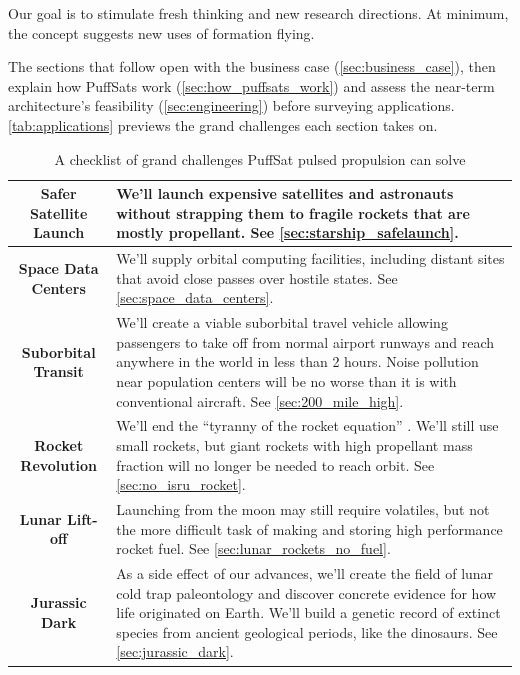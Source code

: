 \documentclass{article}
\begin{document}
Our goal is to stimulate fresh thinking and new research directions. At minimum, the concept suggests new uses of formation flying.

The sections that follow open with the business case (\autoref{sec:business_case}), then explain how PuffSats work (\autoref{sec:how_puffsats_work}) and assess the near-term architecture's feasibility (\autoref{sec:engineering}) before surveying applications. \autoref{tab:applications} previews the grand challenges each section takes on.

\begin{table}[!htpb]
    \centering
    \caption{A checklist of grand challenges PuffSat pulsed propulsion can solve}
    \label{tab:applications}
    \begin{tabularx}{\textwidth}{|c|L|}\hline
        \textbf{Safer Satellite Launch} & We'll launch expensive satellites and astronauts without strapping them to fragile rockets that are mostly propellant.   See \autoref{sec:starship_safelaunch}. \\\hline
        \textbf{Space Data Centers} & We'll supply orbital computing facilities, including distant sites that avoid close passes over hostile states. See \autoref{sec:space_data_centers}. \\\hline
        \textbf{Suborbital Transit} & We'll create a viable suborbital travel vehicle allowing passengers to take off from normal airport runways and reach anywhere in the world in less than 2 hours. Noise pollution near population centers will be no worse than it is with conventional aircraft.  See \autoref{sec:200_mile_high}.\\\hline
        \textbf{Rocket Revolution} & We'll end the ``tyranny of the rocket equation'' \cite{pettit2012tyranny}. We'll still use small rockets, but giant rockets with high propellant mass fraction will no longer be needed to reach orbit. See \autoref{sec:no_isru_rocket}.\\\hline
        \textbf{Lunar Lift-off} & Launching from the moon may still require volatiles, but not the more difficult task of making and storing high performance rocket fuel.   See \autoref{sec:lunar_rockets_no_fuel}.\\ \hline
        \textbf{Jurassic Dark} & As a side effect of our advances, we'll create the field of lunar cold trap paleontology and discover concrete evidence for how life originated on Earth. We'll build a genetic record of extinct species from ancient geological periods, like the dinosaurs. See \autoref{sec:jurassic_dark}. \\\hline

\end{tabularx}
\end{table}
\end{document}
